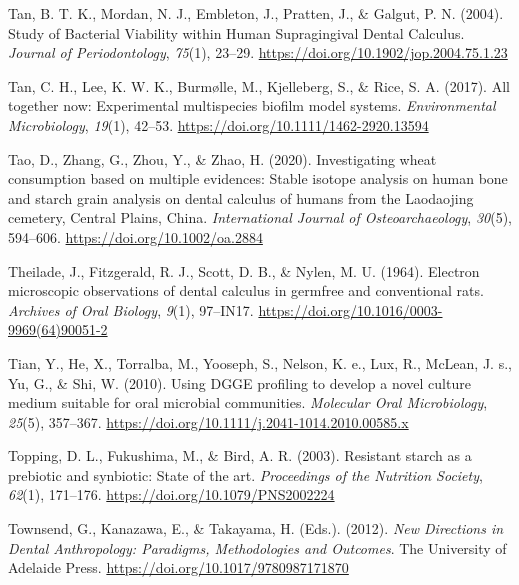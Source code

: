 \documentclass[
  letterpaper,
]{book}
\newlength{\cslhangindent}
\newlength{\cslentryspacingunit} %
\newenvironment{CSLReferences}[2] %
 {%
  \setlength{\parindent}{0pt}
  \ifodd #1
  \let\oldpar\par
  \def\par{\hangindent=\cslhangindent\oldpar}
  \fi
  \setlength{\parskip}{#2\cslentryspacingunit}
 }%
 {}
\begin{document}
\begin{CSLReferences}{1}{0}
\leavevmode{}%
Tan, B. T. K., Mordan, N. J., Embleton, J., Pratten, J., \& Galgut, P.
N. (2004). Study of {Bacterial Viability} within {Human Supragingival
Dental Calculus}. \emph{Journal of Periodontology}, \emph{75}(1),
23--29. \url{https://doi.org/10.1902/jop.2004.75.1.23}

\leavevmode{}%
Tan, C. H., Lee, K. W. K., Burmølle, M., Kjelleberg, S., \& Rice, S. A.
(2017). All together now: Experimental multispecies biofilm model
systems. \emph{Environmental Microbiology}, \emph{19}(1), 42--53.
\url{https://doi.org/10.1111/1462-2920.13594}

\leavevmode{}%
Tao, D., Zhang, G., Zhou, Y., \& Zhao, H. (2020). Investigating wheat
consumption based on multiple evidences: {Stable} isotope analysis on
human bone and starch grain analysis on dental calculus of humans from
the {Laodaojing} cemetery, {Central Plains}, {China}.
\emph{International Journal of Osteoarchaeology}, \emph{30}(5),
594--606. \url{https://doi.org/10.1002/oa.2884}

\leavevmode{}%
Theilade, J., Fitzgerald, R. J., Scott, D. B., \& Nylen, M. U. (1964).
Electron microscopic observations of dental calculus in germfree and
conventional rats. \emph{Archives of Oral Biology}, \emph{9}(1),
97--IN17. \url{https://doi.org/10.1016/0003-9969(64)90051-2}

\leavevmode{}%
Tian, Y., He, X., Torralba, M., Yooseph, S., Nelson, K. e., Lux, R.,
McLean, J. s., Yu, G., \& Shi, W. (2010). Using {DGGE} profiling to
develop a novel culture medium suitable for oral microbial communities.
\emph{Molecular Oral Microbiology}, \emph{25}(5), 357--367.
\url{https://doi.org/10.1111/j.2041-1014.2010.00585.x}

\leavevmode{}%
Topping, D. L., Fukushima, M., \& Bird, A. R. (2003). Resistant starch
as a prebiotic and synbiotic: State of the art. \emph{Proceedings of the
Nutrition Society}, \emph{62}(1), 171--176.
\url{https://doi.org/10.1079/PNS2002224}

\leavevmode{}%
Townsend, G., Kanazawa, E., \& Takayama, H. (Eds.). (2012). \emph{New
{Directions} in {Dental Anthropology}: {Paradigms}, {Methodologies} and
{Outcomes}}. {The University of Adelaide Press}.
\url{https://doi.org/10.1017/9780987171870}


\end{CSLReferences}
\end{document}
